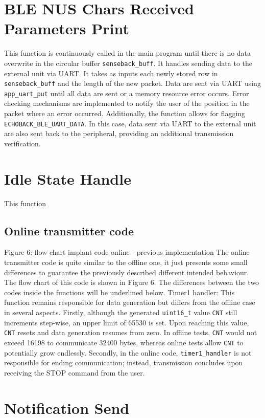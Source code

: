 \documentclass{Configuration_Files/PoliMi3i_thesis}
\begin{document}
\section*{BLE NUS Chars Received Parameters Print}
This function is continuously called in the main program until there is no data overwrite in the circular buffer \texttt{senseback\_buff}. It handles sending data to the external unit via UART. It takes as inputs each newly stored row in \texttt{senseback\_buff} and the length of the new packet. Data are sent via UART using \texttt{app\_uart\_put} until all data are sent or a memory resource error occurs. Error checking mechanisms are implemented to notify the user of the position in the packet where an error occurred. Additionally, the function allows for flagging \texttt{ECHOBACK\_BLE\_UART\_DATA}. In this case, data sent via UART to the external unit are also sent back to the peripheral, providing an additional transmission verification.

\section*{Idle State Handle}
This function

\subsection{Online transmitter code}

Figure 6: flow chart implant code online - previous implementation
The online transmitter code is quite similar to the offline one, it just presents some small differences to guarantee the previously described different intended behaviour. The flow chart of this code is shown in Figure 6. The differences between the two codes inside the functions will be underlined below. 
Timer1 handler: This function remains responsible for data generation but differs from the offline case in several aspects. Firstly, although the generated \texttt{uint16\_t} value \texttt{CNT} still increments step-wise, an upper limit of 65530 is set. Upon reaching this value, \texttt{CNT} resets and data generation resumes from zero. In offline tests, \texttt{CNT} would not exceed 16198 to communicate 32400 bytes, whereas online tests allow \texttt{CNT} to potentially grow endlessly. Secondly, in the online code, \texttt{timer1\_handler} is not responsible for ending communication; instead, transmission concludes upon receiving the STOP command from the user.

\section*{Notification Send}
\end{document}
